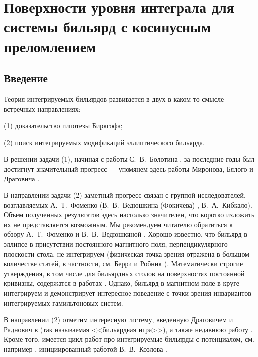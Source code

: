 \chapter{Поверхности уровня интеграла для системы бильярд с косинусным преломлением}\label{ch:ch4}
\section{Введение}\label{sec:ch4/sec1}
Теория интегрируемых бильярдов развивается в двух в каком-то смысле встречных направлениях:

(1) доказательство гипотезы Биркгофа; 

(2) поиск интегрируемых модификаций эллиптического бильярда.

В решении задачи (1), начиная с работы С.~В.~Болотина \cite{Bol90}, за последние годы был достигнут значительный прогресс --- упомянем здесь работы Миронова, Бялого и Драговича \cite{bm2022, bm2024}.

В направлении задачи (2) заметный прогресс связан с группой исследователей, возглавляемых А.~Т.~Фоменко (В.~В.~Ведюшкина (Фокичева) \cite{Fok15, 1},  В.~А.~Кибкало).
Объем полученных результатов здесь настолько значителен, что коротко изложить их не представляется возможным. Мы рекомендуем читателю обратиться к обзору А.~Т.~Фоменко и В.~В.~Ведюшкиной \cite{fv2023}.
Хорошо известно, что бильярд в эллипсе в присутствии постоянного магнитного поля, перпендикулярного плоскости стола, не интегрируем (физическая точка зрения отражена в большом количестве статей, в частности, см. Берри и Робник \cite{berry1985, berry1986}). 
Математически строгие утверждения, в том числе для бильярдных столов на поверхностях постоянной кривизны,  содержатся в работах \cite{bm2019, zbMATH06661562, bm2020}.
Однако, бильярд в магнитном поле в круге интегрируем и демонстрирует интересное поведение с точки зрения инвариантов интегрируемых гамильтоновых систем.

В направлении (2) отметим интересную систему, введенную Драговичем и Раднович в \cite{DraGasRad22} (так называемая <<бильярдная игра>>),  а также недавнюю работу \cite{wire}.
Кроме того, имеется цикл работ про интегрируемые бильярды с потенциалом, см. например \cite{Dra1, Dra4}, инициированный работой В.~В.~Козлова \cite{Kozlov}.

\medskip

